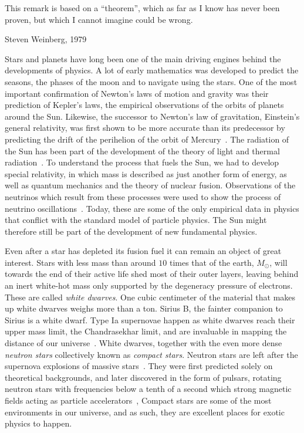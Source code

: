 \epigraph{ 
    This remark is based on a ``theorem'', which as far as I know has never been proven, but which I cannot imagine could be wrong.
}
{
    Steven Weinberg, 1979~\autocite{weinbergPhenomenologicalLagrangians1979a}
}


Stars and planets have long been one of the main driving engines behind the developments of physics.
A lot of early mathematics was developed to predict the seasons, the phases of the moon and to navigate using the stars.
One of the most important confirmation of Newton's laws of motion and gravity was their prediction of Kepler's laws, the empirical observations of the orbits of planets around the Sun.
Likewise, the successor to Newton's law of gravitation, Einstein's general relativity, was first shown to be more accurate than its predecessor by predicting the drift of the perihelion of the orbit of Mercury~\autocite{carrollSpacetimeGeometryIntroduction2019}.
The radiation of the Sun has been part of the development of the theory of light and thermal radiation~\autocite{hemmerTermiskFysikk2002}.
To understand the process that fuels the Sun, we had to develop special relativity, in which mass is described as just another form of energy, as well as quantum mechanics and the theory of nuclear fusion.
Observations of the neutrinos which result from these processes were used to show the process of neutrino oscillations~\autocite{prialnikIntroductionTheoryStellar2000}.
Today, these are some of the only empirical data in physics that conflict with the standard model of particle physics.
The Sun might therefore still be part of the development of new fundamental physics.

Even after a star has depleted its fusion fuel it can remain an object of great interest.
Stars with less mass than around $10$ times that of the earth, $M_\odot$, will towards the end of their active life shed most of their outer layers, leaving behind an inert white-hot mass only supported by the degeneracy pressure of electrons.
These are called \emph{white dwarves}.
One cubic centimeter of the material that makes up white dwarves weighs more than a ton.
Sirius B, the fainter companion to Sirius is a white dwarf.
Type Ia supernovae happen as white dwarves reach their upper mass limit, the Chandrasekhar limit, and are invaluable in mapping the distance of our universe~\autocite{carrollSpacetimeGeometryIntroduction2019}.
White dwarves, together with the even more dense \emph{neutron stars} collectively known as \emph{compact stars}.
Neutron stars are left after the supernova explosions of massive stars~\autocite{prialnikIntroductionTheoryStellar2000}.
They were first predicted solely on theoretical backgrounds, and later discovered in the form of pulsars, rotating neutron stars with frequencies below a tenth of a second which strong magnetic fields acting as particle accelerators~\autocite{prialnikIntroductionTheoryStellar2000},
Compact stars are some of the most environments in our universe, and as such, they are excellent places for exotic physics to happen.

